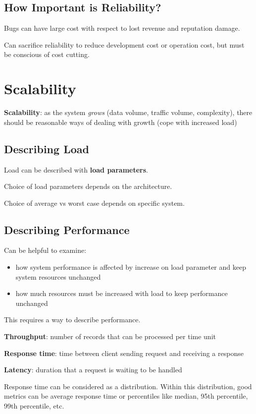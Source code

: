\documentclass[11pt]{article}
\begin{document}
\subsection{How Important is Reliability?}
\label{sec:org8024643}
Bugs can have large cost with respect to lost revenue and
reputation damage.

Can sacrifice reliability to reduce development cost or
operation cost, but must be conscious of cost cutting.
\section{Scalability}
\label{sec:org96791f9}
\textbf{Scalability}: as the system \emph{grows} (data volume, traffic volume, complexity), there should be reasonable
ways of dealing with growth (cope with increased load)
\subsection{Describing Load}
\label{sec:org55ad82f}
Load can be described with \textbf{load parameters}.

Choice of load parameters depends on the architecture.

Choice of average vs worst case depends on specific system.
\subsection{Describing Performance}
\label{sec:org9c58a31}
Can be helpful to examine:
\begin{itemize}
\item how system performance is affected by increase on load parameter and
keep system resources unchanged
\item how much resources must be increased with load to keep performance unchanged
\end{itemize}

This requires a way to describe performance.

\textbf{Throughput}: number of records that can be processed per time unit

\textbf{Response time}: time between client sending request and receiving a response

\textbf{Latency}: duration that a request is waiting to be handled

Response time can be considered as a distribution.
Within this distribution, good metrics can be average response time or percentiles
like median, 95th percentile, 99th percentile, etc.
\end{document}
